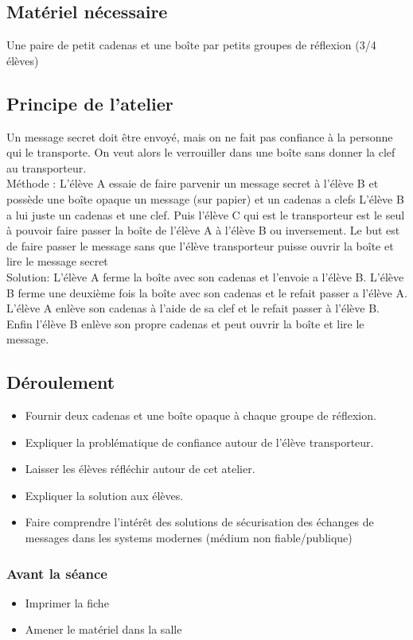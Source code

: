 \documentclass[a4paper]{article}
\begin{document}
\subsection{Matériel nécessaire}
Une paire de petit cadenas et une boîte par petits groupes de réflexion (3/4 élèves)

\subsection{Principe de l'atelier}
Un message secret doit être envoyé, mais on ne fait pas confiance à la personne qui le transporte. On veut alors le verrouiller dans une boîte sans donner la clef au transporteur.
\\
Méthode : 
L'élève A essaie de faire parvenir un message secret à l'élève B et possède une boîte opaque un message (sur papier) et un cadenas a clefs L'élève B a lui juste un cadenas et une clef.
Puis l'élève C qui est le transporteur est le seul à pouvoir faire passer la boîte de l'élève A à l'élève B ou inversement. Le but est de faire passer le message sans que l'élève transporteur puisse ouvrir la boîte et lire le message secret
\\
Solution:
L'élève A ferme la boîte avec son cadenas et l'envoie a l'élève B. L'élève B ferme une deuxième fois la boîte avec son cadenas et le refait passer a l'élève A. 
L'élève A enlève son cadenas à l'aide de sa clef et le refait passer à l'élève B. Enfin l'élève B enlève son propre cadenas et peut ouvrir la boîte et lire le message.


\subsection{Déroulement}
\begin{itemize}
    \setlength\itemsep{0em}
    \item Fournir deux cadenas et une boîte opaque à chaque groupe de réflexion.
    \item Expliquer la problématique de confiance autour de l'élève transporteur.
    \item Laisser les élèves réfléchir autour de cet atelier.
    \item Expliquer la solution aux élèves.
    \item Faire comprendre l'intérêt des solutions de sécurisation des échanges de messages dans les systems modernes (médium non fiable/publique)
\end{itemize}

\subsubsection{Avant la séance}
\begin{itemize}
  \setlength\itemsep{0em}
  \item Imprimer la fiche
  \item Amener le matériel dans la salle
  
\end{itemize}
\end{document}
